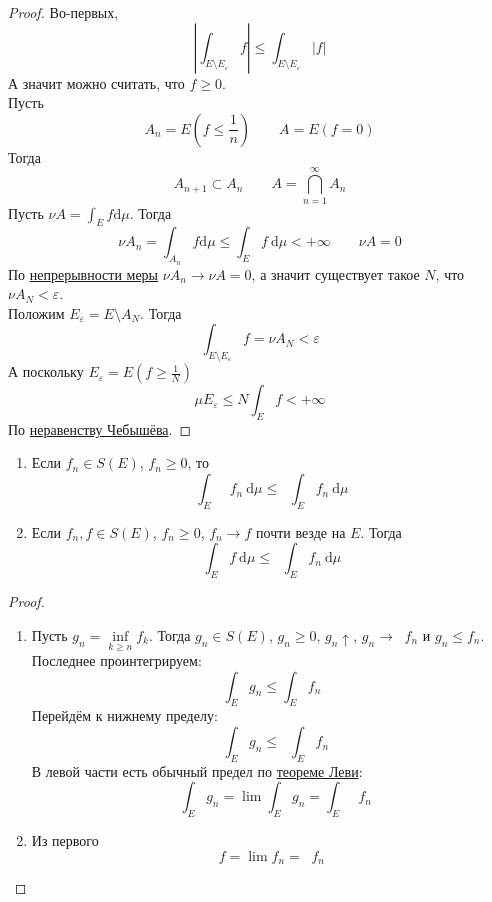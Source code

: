 \documentclass{article}
\let\eps\varepsilon
\DeclareMathOperator*{\liminf}{\underline{\lim}}
\begin{document}
    \begin{proof}
        Во-первых,
        $$
        \left|\int_{E\setminus E_\eps}f\right|\leqslant\int_{E\setminus E_\eps}|f|
        $$
        А значит можно считать, что $f\geqslant 0$.\\
        Пусть
        $$
        A_n=E\left(f\leqslant\frac1n\right)\qquad A=E(f=0)
        $$
        Тогда
        $$
        A_{n+1}\subset A_n\qquad A=\bigcap\limits_{n=1}^\infty A_n
        $$
        Пусть $\nu A=\int_Ef\mathrm d\mu$. Тогда
        $$
        \nu A_n=\int_{A_n}f\mathrm d\mu\leqslant\int_Ef~\mathrm d\mu<+\infty\qquad \nu A=0
        $$
        По \hyperref[Непрерывность меры]{непрерывности меры} $\nu A_n\rightarrow \nu A=0$, а значит существует такое $N$, что $\nu A_N<\eps$.\\
        Положим $E_\eps=E\setminus A_N$. Тогда
        $$
        \int_{E\setminus E_\eps}f=\nu A_N<\eps
        $$
        А поскольку $E_\eps=E(f\geqslant\frac1N)$
        $$
        \mu E_\eps\leqslant N\int_Ef<+\infty
        $$
        По \hyperref[Неравенство Чебышёва]{неравенству Чебышёва}.
    \end{proof}
    \begin{theorem}
        \label{Теорема Фату}
        \begin{enumerate}
            \item Если $f_n\in S(E)$, $f_n\geqslant0$, то
            $$
            \int_E\liminf f_n~\mathrm d\mu\leqslant\liminf \int_Ef_n~\mathrm d\mu
            $$
            \item Если $f_n,f\in S(E)$, $f_n\geqslant0$, $f_n\rightarrow f$ почти везде на $E$. Тогда
            $$
            \int_Ef~\mathrm d\mu\leqslant\liminf\int_Ef_n~\mathrm d\mu
            $$
        \end{enumerate}
    \end{theorem}
    \begin{proof}
        \begin{enumerate}
            \item Пусть $g_n=\inf\limits_{k\geqslant n}f_k$. Тогда $g_n\in S(E)$, $g_n\geqslant0$, $g_n\uparrow$, $g_n\rightarrow\liminf f_n$ и $g_n\leqslant f_n$.\\
            Последнее проинтегрируем:
            $$
            \int_Eg_n\leqslant\int_Ef_n
            $$
            Перейдём к нижнему пределу:
            $$
            \liminf\int_Eg_n\leqslant\liminf\int_Ef_n
            $$
            В левой части есть обычный предел по \hyperref[Теорема Леви]{теореме Леви}:
            $$
            \liminf\int_Eg_n=\lim\int_Eg_n=\int_E\liminf f_n
            $$
            \item Из первого
            $$
            f=\lim f_n=\liminf f_n
            $$
        \end{enumerate}
    \end{proof}
\end{document}

